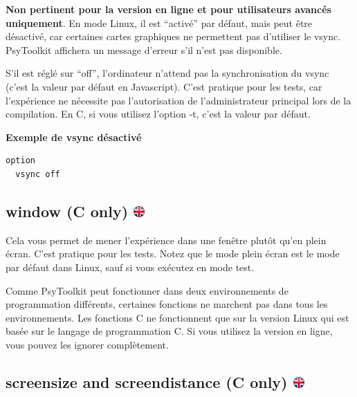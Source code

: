 \documentclass[
]{book}
\begin{document}
\textbf{Non pertinent pour la version en ligne et pour utilisateurs avancés uniquement}. En mode Linux, il est ``activé'' par défaut, mais peut être désactivé, car certaines cartes graphiques ne permettent pas d'utiliser le vsync. PsyToolkit affichera un message d'erreur s'il n'est pas disponible.

S'il est réglé sur ``off'', l'ordinateur n'attend pas la synchronisation du vsync (c'est la valeur par défaut en Javascript). C'est pratique pour les tests, car l'expérience ne nécessite pas l'autorisation de l'administrateur principal lors de la compilation. En C, si vous utilisez l'option -t, c'est la valeur par défaut.

\textbf{Exemple de vsync désactivé}

\begin{verbatim}
option
  vsync off
\end{verbatim}

\hypertarget{window-c-only}{%
\subsection[window (C only) ]{\texorpdfstring{window (C only) \href{https://www.psytoolkit.org/doc3.4.0/syntax.html\#options-window}{\protect\includegraphics{img/ukflag.png}}}{window (C only) }}\label{window-c-only}}

Cela vous permet de mener l'expérience dans une fenêtre plutôt qu'en plein écran. C'est pratique pour les tests. Notez que le mode plein écran est le mode par défaut dans Linux, sauf si vous exécutez en mode test.

Comme PsyToolkit peut fonctionner dans deux environnements de programmation différents, certaines fonctions ne marchent pas dans tous les environnements. Les fonctions C ne fonctionnent que sur la version Linux qui est basée sur le langage de programmation C. Si vous utilisez la version en ligne, vous pouvez les ignorer complètement.

\hypertarget{screensize-and-screendistance-c-only}{%
\subsection[screensize and screendistance (C only) ]{\texorpdfstring{screensize and screendistance (C only) \href{https://www.psytoolkit.org/doc3.4.0/syntax.html\#options-screendistance}{\protect\includegraphics{img/ukflag.png}}}{screensize and screendistance (C only) }}\label{screensize-and-screendistance-c-only}}
\end{document}
